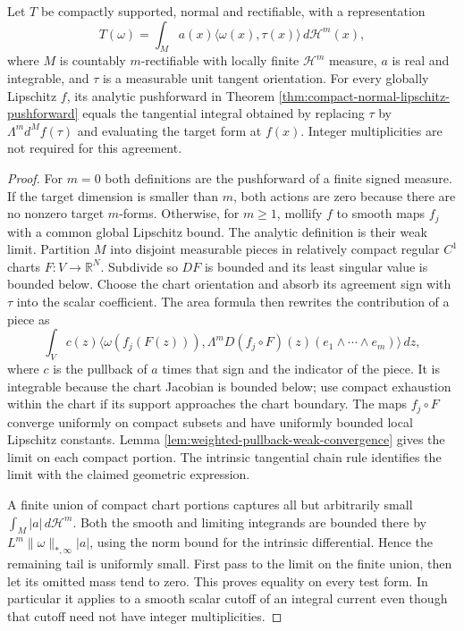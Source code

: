 \begin{proposition}\label{prop:normal-geometric-pushforward-agreement}
Let $T$ be compactly supported, normal and rectifiable, with a representation
\[
 T(\omega)=\int_M a(x)\langle\omega(x),\tau(x)\rangle\,d\mathcal H^m(x),
\]
where $M$ is countably $m$-rectifiable with locally finite $\mathcal H^m$ measure, $a$ is real and integrable, and $\tau$ is a measurable unit tangent orientation. For every globally Lipschitz $f$, its analytic pushforward in Theorem \ref{thm:compact-normal-lipschitz-pushforward} equals the tangential integral obtained by replacing $\tau$ by $\Lambda^m d^Mf(\tau)$ and evaluating the target form at $f(x)$. Integer multiplicities are not required for this agreement.
\end{proposition}
\begin{proof}
For $m=0$ both definitions are the pushforward of a finite signed measure. If the target dimension is smaller than $m$, both actions are zero because there are no nonzero target $m$-forms. Otherwise, for $m\geq1$, mollify $f$ to smooth maps $f_j$ with a common global Lipschitz bound. The analytic definition is their weak limit. Partition $M$ into disjoint measurable pieces in relatively compact regular $C^1$ charts $F:V\to\mathbb R^N$. Subdivide so $DF$ is bounded and its least singular value is bounded below. Choose the chart orientation and absorb its agreement sign with $\tau$ into the scalar coefficient. The area formula then rewrites the contribution of a piece as
\[
 \int_V c(z)\bigl\langle\omega(f_j(F(z))),
           \Lambda^mD(f_j\circ F)(z)(e_1\wedge\cdots\wedge e_m)
                 \bigr\rangle\,dz,
\]
where $c$ is the pullback of $a$ times that sign and the indicator of the piece. It is integrable because the chart Jacobian is bounded below; use compact exhaustion within the chart if its support approaches the chart boundary. The maps $f_j\circ F$ converge uniformly on compact subsets and have uniformly bounded local Lipschitz constants. Lemma \ref{lem:weighted-pullback-weak-convergence} gives the limit on each compact portion. The intrinsic tangential chain rule identifies the limit with the claimed geometric expression.

A finite union of compact chart portions captures all but arbitrarily small $\int_M|a|\,d\mathcal H^m$. Both the smooth and limiting integrands are bounded there by $L^m\|\omega\|_{*,\infty}|a|$, using the norm bound for the intrinsic differential. Hence the remaining tail is uniformly small. First pass to the limit on the finite union, then let its omitted mass tend to zero. This proves equality on every test form. In particular it applies to a smooth scalar cutoff of an integral current even though that cutoff need not have integer multiplicities.
\end{proof}

